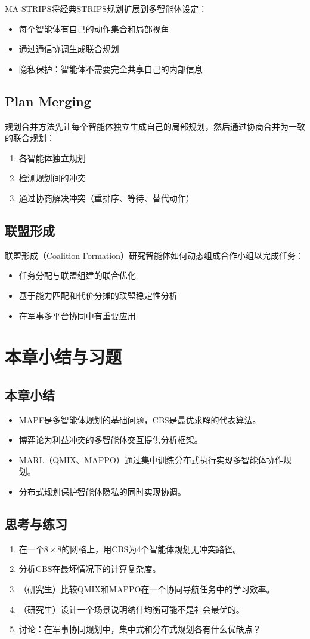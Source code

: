 MA-STRIPS将经典STRIPS规划扩展到多智能体设定：
\begin{itemize}
  \item 每个智能体有自己的动作集合和局部视角
  \item 通过通信协调生成联合规划
  \item 隐私保护：智能体不需要完全共享自己的内部信息
\end{itemize}

\subsection{Plan Merging}

规划合并方法先让每个智能体独立生成自己的局部规划，然后通过协商合并为一致的联合规划：
\begin{enumerate}
  \item 各智能体独立规划
  \item 检测规划间的冲突
  \item 通过协商解决冲突（重排序、等待、替代动作）
\end{enumerate}

\subsection{联盟形成}

联盟形成（Coalition Formation）研究智能体如何动态组成合作小组以完成任务：
\begin{itemize}
  \item 任务分配与联盟组建的联合优化
  \item 基于能力匹配和代价分摊的联盟稳定性分析
  \item 在军事多平台协同中有重要应用
\end{itemize}

\section{本章小结与习题}

\subsection*{本章小结}
\begin{itemize}
  \item MAPF是多智能体规划的基础问题，CBS是最优求解的代表算法。
  \item 博弈论为利益冲突的多智能体交互提供分析框架。
  \item MARL（QMIX、MAPPO）通过集中训练分布式执行实现多智能体协作规划。
  \item 分布式规划保护智能体隐私的同时实现协调。
\end{itemize}

\subsection*{思考与练习}
\begin{enumerate}
  \item 在一个$8 \times 8$的网格上，用CBS为4个智能体规划无冲突路径。
  \item 分析CBS在最坏情况下的计算复杂度。
  \item （研究生）比较QMIX和MAPPO在一个协同导航任务中的学习效率。
  \item （研究生）设计一个场景说明纳什均衡可能不是社会最优的。
  \item 讨论：在军事协同规划中，集中式和分布式规划各有什么优缺点？
\end{enumerate}
